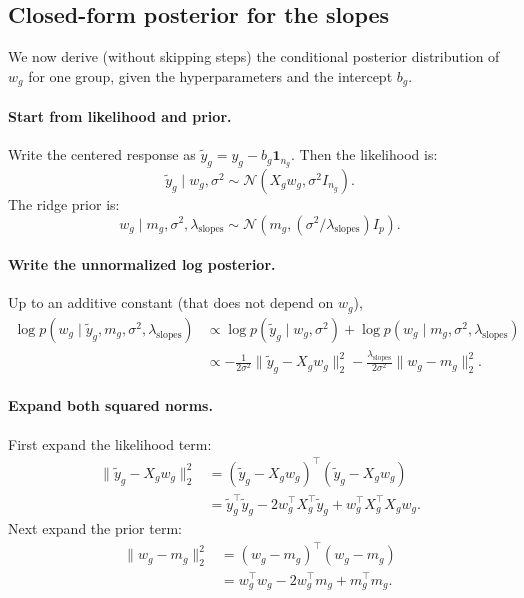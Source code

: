 \documentclass[11pt]{article}
\begin{document}
\subsection{Closed-form posterior for the slopes}

We now derive (without skipping steps) the conditional posterior distribution of $w_g$ for one group, given the
hyperparameters and the intercept $b_g$.

\paragraph{Start from likelihood and prior.}
Write the centered response as $\tilde{y}_g = y_g - b_g\mathbf{1}_{n_g}$.
Then the likelihood is:
\[
  \tilde{y}_g \mid w_g,\sigma^2 \sim \mathcal{N}(X_g w_g,\sigma^2 I_{n_g}).
\]
The ridge prior is:
\[
  w_g \mid m_g,\sigma^2,\lambda_{\mathrm{slopes}} \sim \mathcal{N}\!\left(m_g,(\sigma^2/\lambda_{\mathrm{slopes}})I_p\right).
\]

\paragraph{Write the unnormalized log posterior.}
Up to an additive constant (that does not depend on $w_g$),
\begin{align*}
  \log p(w_g \mid \tilde{y}_g,m_g,\sigma^2,\lambda_{\mathrm{slopes}})
  &\propto \log p(\tilde{y}_g \mid w_g,\sigma^2) + \log p(w_g \mid m_g,\sigma^2,\lambda_{\mathrm{slopes}}) \\
  &\propto -\frac{1}{2\sigma^2}\|\tilde{y}_g - X_g w_g\|_2^2
           -\frac{\lambda_{\mathrm{slopes}}}{2\sigma^2}\|w_g - m_g\|_2^2.
\end{align*}

\paragraph{Expand both squared norms.}
First expand the likelihood term:
\begin{align*}
  \|\tilde{y}_g - X_g w_g\|_2^2
  &= (\tilde{y}_g - X_g w_g)^\top(\tilde{y}_g - X_g w_g) \\
  &= \tilde{y}_g^\top\tilde{y}_g - 2 w_g^\top X_g^\top \tilde{y}_g + w_g^\top X_g^\top X_g w_g.
\end{align*}
Next expand the prior term:
\begin{align*}
  \|w_g - m_g\|_2^2
  &= (w_g - m_g)^\top(w_g - m_g) \\
  &= w_g^\top w_g - 2 w_g^\top m_g + m_g^\top m_g.
\end{align*}
\end{document}
